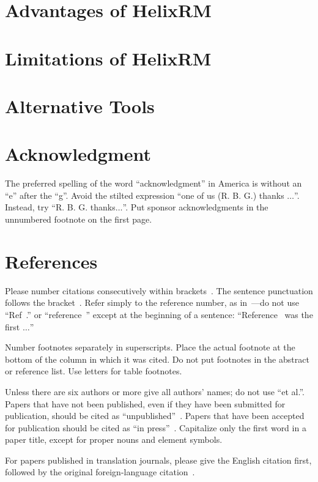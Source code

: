 \documentclass[conference]{IEEEtran}
\begin{document}





\section{Advantages of HelixRM}\label{sec:advantages-of-helixrm}


\section{Limitations of HelixRM}\label{sec:limitations-of-helixrm}


\section{Alternative Tools}\label{sec:alternative-tools}


\section{Acknowledgment}\label{sec:acknowledgment}
The preferred spelling of the word ``acknowledgment'' in America is without
an ``e'' after the ``g''.
Avoid the stilted expression ``one of us (R. B\@.
G.) thanks $\ldots$''.
Instead, try ``R. B. G. thanks$\ldots$''.
Put sponsor acknowledgments in the unnumbered footnote on the first page.

\section*{References}

Please number citations consecutively within brackets~\cite{b1}.
The sentence punctuation follows the bracket~\cite{b2}.
Refer simply to the reference number, as in~\cite{b3}---do not use ``Ref~\cite{b3}.'' or ``reference~\cite{b3}'' except at
the beginning of a sentence: ``Reference~\cite{b3} was the first $\ldots$''

Number footnotes separately in superscripts.
Place the actual footnote at the bottom of the column in which it was cited.
Do not put footnotes in the abstract or reference list.
Use letters for table footnotes.

Unless there are six authors or more give all authors' names; do not use
``et al.''.
Papers that have not been published, even if they have been
submitted for publication, should be cited as ``unpublished''~\cite{b4}.
Papers that have been accepted for publication should be cited as ``in press''~\cite{b5}.
Capitalize only the first word in a paper title, except for proper nouns and
element symbols.

For papers published in translation journals, please give the English
citation first, followed by the original foreign-language citation~\cite{b6}.


%


\end{document}
